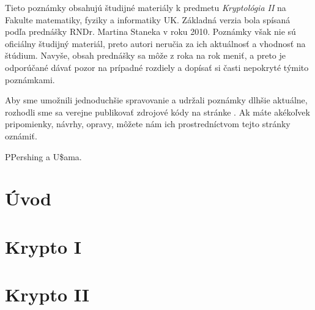 \documentclass[a4paper]{report}
\begin{document}
Tieto poznámky obsahujú študijné materiály k predmetu 
\emph{Kryptológia II}
na Fakulte matematiky, fyziky a informatiky UK.
Základná verzia bola spísaná podľa prednášky RNDr. Martina Staneka v
roku 2010. Poznámky však nie sú oficiálny študijný materiál, preto
autori neručia za ich aktuálnosť a vhodnosť na štúdium. Navyše, obsah
prednášky sa môže z roka na rok meniť, a preto je odporúčané dávať
pozor na prípadné rozdiely a dopísať si časti nepokryté týmito
poznámkami.

Aby sme umožnili jednoduchšie spravovanie a udržali poznámky dlhšie
aktuálne, rozhodli sme sa verejne publikovať zdrojové kódy na stránke
\projecturl. Ak máte akékoľvek pripomienky,
návrhy, opravy, môžete nám ich prostredníctvom tejto stránky oznámiť.

PPershing a U\$ama.


\tableofcontents

\chapter{Úvod}
\label{chapter:uvod}



\chapter{Krypto I}
\label{chapter:krypto}






\chapter{Krypto II}
\label{chapter:krypto2}



















\listoffigures
\listoftables



\end{document}
